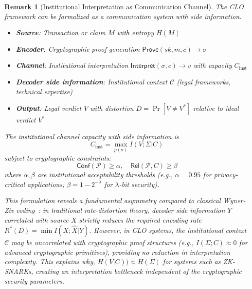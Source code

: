 \documentclass{ieeeaccess}
\newtheorem{remark}{Remark}[subsection]
\begin{document}
\begin{remark}[Institutional Interpretation as Communication Channel]\label{rem:channel}
The CLO framework can be formalized as a communication system with side information.
\begin{itemize}
\item \textbf{Source}: Transaction or claim $M$ with entropy $H(M)$
\item \textbf{Encoder}: Cryptographic proof generation $\mathsf{Prove}(sk, m, c) \to \sigma$
\item \textbf{Channel}: Institutional interpretation $\mathsf{Interpret}(\sigma, c) \to v$ with capacity $C_{\text{inst}}$
\item \textbf{Decoder side information}: Institutional context $\mathcal{C}$ (legal frameworks, technical expertise)
\item \textbf{Output}: Legal verdict $V$ with distortion $D = \Pr[V \neq V^*]$ relative to ideal verdict $V^*$
\end{itemize}

The institutional channel capacity with side information is
\begin{equation}
C_{\text{inst}} = \max_{p(\sigma)} I(V;\Sigma|C)
\end{equation}
subject to cryptographic constraints:
\begin{equation}
\mathsf{Conf}(\mathcal{P}) \geq \alpha, \quad \mathsf{Rel}(\mathcal{P}, C) \geq \beta
\end{equation}
where $\alpha, \beta$ are institutional acceptability thresholds (e.g., $\alpha = 0.95$ for privacy-critical applications; $\beta = 1 - 2^{-\lambda}$ for $\lambda$-bit security).

This formulation reveals a fundamental asymmetry compared to classical Wyner-Ziv coding~\cite{WynerZiv76}: in traditional rate-distortion theory, decoder side information $Y$ correlated with source $X$ strictly reduces the required encoding rate $R^*(D) = \min I(X;\hat{X}|Y)$. However, in CLO systems, the institutional context $\mathcal{C}$ may be \emph{uncorrelated} with cryptographic proof structures (e.g., $I(\Sigma;C) \approx 0$ for advanced cryptographic primitives), providing no reduction in interpretation complexity. This explains why, $H(V|C)) \approx H(\Sigma)$ for systems such as ZK-SNARKs, creating an interpretation bottleneck independent of the cryptographic security parameters.
\end{remark}
\end{document}
